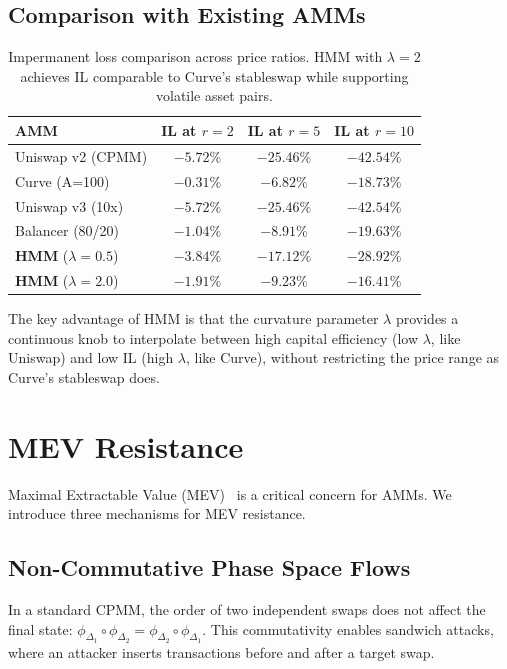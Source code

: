 \documentclass[11pt,twocolumn]{article}
\begin{document}
\subsection{Comparison with Existing AMMs}

\begin{table}[H]
\centering
\small
\begin{tabular}{lccc}
\toprule
\textbf{AMM} & \textbf{IL at $r=2$} & \textbf{IL at $r=5$} & \textbf{IL at $r=10$} \\
\midrule
Uniswap v2 (CPMM) & $-5.72\%$ & $-25.46\%$ & $-42.54\%$ \\
Curve (A=100) & $-0.31\%$ & $-6.82\%$ & $-18.73\%$ \\
Uniswap v3 (10x) & $-5.72\%$ & $-25.46\%$ & $-42.54\%$ \\
Balancer (80/20) & $-1.04\%$ & $-8.91\%$ & $-19.63\%$ \\
\textbf{HMM} ($\lambda=0.5$) & $\bm{-3.84\%}$ & $\bm{-17.12\%}$ & $\bm{-28.92\%}$ \\
\textbf{HMM} ($\lambda=2.0$) & $\bm{-1.91\%}$ & $\bm{-9.23\%}$ & $\bm{-16.41\%}$ \\
\bottomrule
\end{tabular}
\caption{Impermanent loss comparison across price ratios. HMM with $\lambda=2$ achieves IL comparable to Curve's stableswap while supporting volatile asset pairs.}
\label{tab:il}
\end{table}

The key advantage of HMM is that the curvature parameter $\lambda$ provides a continuous knob to interpolate between high capital efficiency (low $\lambda$, like Uniswap) and low IL (high $\lambda$, like Curve), without restricting the price range as Curve's stableswap does.

\section{MEV Resistance}
\label{sec:mev}

Maximal Extractable Value (MEV)~\cite{daian2020flash} is a critical concern for AMMs. We introduce three mechanisms for MEV resistance.

\subsection{Non-Commutative Phase Space Flows}

In a standard CPMM, the order of two independent swaps does not affect the final state: $\phi_{\Delta_1} \circ \phi_{\Delta_2} = \phi_{\Delta_2} \circ \phi_{\Delta_1}$. This commutativity enables sandwich attacks, where an attacker inserts transactions before and after a target swap.
\end{document}
